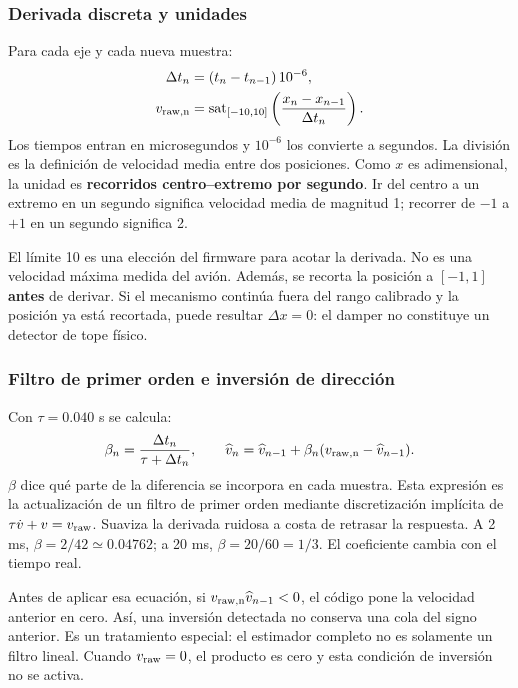 \documentclass[11pt,a4paper]{article}
\newcommand{\sat}{\operatorname{sat}}
\begin{document}
\subsubsection{Derivada discreta y unidades}
Para cada eje y cada nueva muestra:
\begin{align}
\Delta t_n&=(t_n-t_{n-1})\,10^{-6},\\
v_{\rm raw,n}&=\sat_{[-10,10]}\left(\frac{x_n-x_{n-1}}{\Delta t_n}\right).
\end{align}
Los tiempos entran en microsegundos y $10^{-6}$ los convierte a segundos. La división es la definición de velocidad media entre dos posiciones. Como $x$ es adimensional, la unidad es \textbf{recorridos centro--extremo por segundo}. Ir del centro a un extremo en un segundo significa velocidad media de magnitud 1; recorrer de $-1$ a $+1$ en un segundo significa 2.

El límite 10 es una elección del firmware para acotar la derivada. No es una velocidad máxima medida del avión. Además, se recorta la posición a $[-1,1]$ \textbf{antes} de derivar. Si el mecanismo continúa fuera del rango calibrado y la posición ya está recortada, puede resultar $\Delta x=0$: el damper no constituye un detector de tope físico.

\subsubsection{Filtro de primer orden e inversión de dirección}
Con $\tau=0.040$ s se calcula:
\begin{equation}
\beta_n=\frac{\Delta t_n}{\tau+\Delta t_n},\qquad
\widehat v_n=\widehat v_{n-1}+\beta_n(v_{\rm raw,n}-\widehat v_{n-1}).
\label{eq:damper_filtro}
\end{equation}
$\beta$ dice qué parte de la diferencia se incorpora en cada muestra. Esta expresión es la actualización de un filtro de primer orden mediante discretización implícita de $\tau\dot{v}+v=v_{\rm raw}$. Suaviza la derivada ruidosa a costa de retrasar la respuesta. A 2 ms, $\beta=2/42\simeq0.04762$; a 20 ms, $\beta=20/60=1/3$. El coeficiente cambia con el tiempo real.

Antes de aplicar esa ecuación, si $v_{\rm raw,n}\widehat v_{n-1}<0$, el código pone la velocidad anterior en cero. Así, una inversión detectada no conserva una cola del signo anterior. Es un tratamiento especial: el estimador completo no es solamente un filtro lineal. Cuando $v_{\rm raw}=0$, el producto es cero y esta condición de inversión no se activa.
\end{document}
